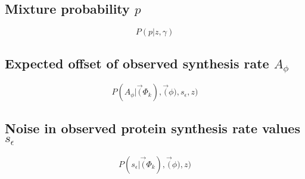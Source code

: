 \documentclass[11pt]{article}
\begin{document}
  \subsection{Mixture probability $p$}
  \begin{equation}
   P(p | z, \gamma) 
  \end{equation}
  
  \subsection{Expected offset of observed synthesis rate $A_{\phi}$}
  \begin{equation}
   P(A_{\phi} |\vec(\Phi_k), \vec(\phi), s_{\epsilon}, z) 
  \end{equation}
  
  \subsection{Noise in observed protein synthesis rate values $s_{\epsilon}$}
  \begin{equation}
   P(s_{\epsilon} | \vec(\Phi_k), \vec(\phi), z) 
  \end{equation}
  
\end{document}
